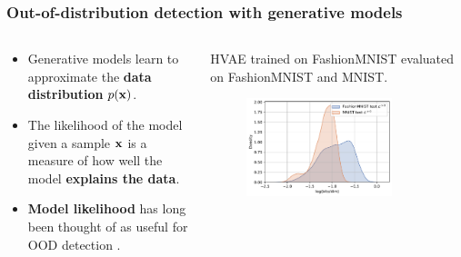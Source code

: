 \begin{frame}
    \frametitle{Out-of-distribution detection with generative models}
    \begin{columns}[t]
        \begin{column}{0.4\textwidth}
            \begin{itemize}
                \item Generative models learn to approximate the \textbf{data distribution} $p({\mathbf{x}})$.
                \item The likelihood of the model given a sample ${\mathbf{x}}$ is a measure of how well the model \textbf{explains the data}.
                \item \textbf{Model likelihood} has long been thought of as useful for OOD detection \cite{bishop_novelty_1994}.
            \end{itemize}
        \end{column}
        \begin{column}{0.6\textwidth}
            \begin{overprint}
                {\footnotesize HVAE trained on FashionMNIST evaluated on FashionMNIST and MNIST.}
                \begin{figure}
                    \centering
                    \includegraphics[width=0.8\textwidth]{../graphics/paper_hierarchical/densities-FashionMNIST-test-MNIST-test-bpp-k-0_sohau.pdf}
                \end{figure}
            \end{overprint}
        \end{column}
    \end{columns}
\end{frame}



